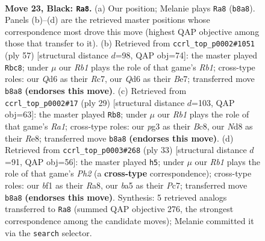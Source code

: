 \documentclass[11pt]{article}
\begin{document}
\clearpage

\begin{figure}[p]\centering
\begin{subfigure}{0.46\textwidth}\centering
\resizebox{\linewidth}{!}{%
\newchessgame
\chessboard[
  setfen={1rbn1k2/1ppp1ppp/p2q4/B2Pr3/Q3n2N/4P1P1/PP2RP1P/1R3BK1 b - - 22 23},
  showmover=false,
  pgfstyle=straightmove, color=movearrow, markmove={b8-a8}
]}
\caption{}
\end{subfigure}\hfill
\begin{subfigure}{0.46\textwidth}\centering
\resizebox{\linewidth}{!}{%
\newchessgame
\chessboard[
  setfen={1r4k1/2r1bp1p/p2p2p1/1p2pqP1/5n1P/PB3P2/1PP4R/1KBRQ3 b - - 19 29},
  showmover=false,
  pgfstyle=straightmove, color=movearrow, markmove={b8-c8}
]}
\caption{}
\end{subfigure}
\\[4pt]
\begin{subfigure}{0.46\textwidth}\centering
\resizebox{\linewidth}{!}{%
\newchessgame
\chessboard[
  setfen={r1b1r1k1/1pp1qpp1/p1n2n1p/2P5/2BPp3/4P2P/P1QN1PP1/R1B1R1K1 b - - 3 15},
  showmover=false,
  pgfstyle=straightmove, color=movearrow, markmove={a8-b8}
]}
\caption{}
\end{subfigure}\hfill
\begin{subfigure}{0.46\textwidth}\centering
\resizebox{\linewidth}{!}{%
\newchessgame
\chessboard[
  setfen={r3r1k1/1pp2pbp/1n1p1qp1/p2P4/2PpP1B1/1N4P1/PPR2P1P/3QR1K1 b - - 3 17},
  showmover=false,
  pgfstyle=straightmove, color=movearrow, markmove={h7-h5}
]}
\caption{}
\end{subfigure}
\caption{\textbf{Move 23, Black: \texttt{Ra8}.} (a) Our position; Melanie plays \texttt{Ra8} (\texttt{b8a8}). Panels (b)--(d) are the retrieved master positions whose correspondence most drove this move (highest QAP objective among those that transfer to it). (b) Retrieved from \texttt{ccrl\_top\_p0002\#1051} (ply 57) [structural distance $d$=98, QAP obj=74]: the master played \texttt{Rbc8}; under $\mu$ our \emph{Rb1} plays the role of that game's \emph{Rb1}; cross-type roles: our \emph{Q}d6 as their \emph{R}c7, our \emph{Q}d6 as their \emph{B}e7; transferred move \texttt{b8a8} \textbf{(endorses this move)}. (c) Retrieved from \texttt{ccrl\_top\_p0002\#17} (ply 29) [structural distance $d$=103, QAP obj=63]: the master played \texttt{Rb8}; under $\mu$ our \emph{Rb1} plays the role of that game's \emph{Ra1}; cross-type roles: our \emph{p}g3 as their \emph{B}c8, our \emph{N}d8 as their \emph{R}e8; transferred move \texttt{b8a8} \textbf{(endorses this move)}. (d) Retrieved from \texttt{ccrl\_top\_p0003\#268} (ply 33) [structural distance $d$=91, QAP obj=56]: the master played \texttt{h5}; under $\mu$ our \emph{Rb1} plays the role of that game's \emph{Ph2} (a \textbf{cross-type} correspondence); cross-type roles: our \emph{b}f1 as their \emph{R}a8, our \emph{b}a5 as their \emph{P}c7; transferred move \texttt{b8a8} \textbf{(endorses this move)}. Synthesis: 5 retrieved analogs transferred to \texttt{Ra8} (summed QAP objective 276, the strongest correspondence among the candidate moves); Melanie committed it via the \texttt{search} selector.}
\label{fig:thought-m45}
\end{figure}
\end{document}
